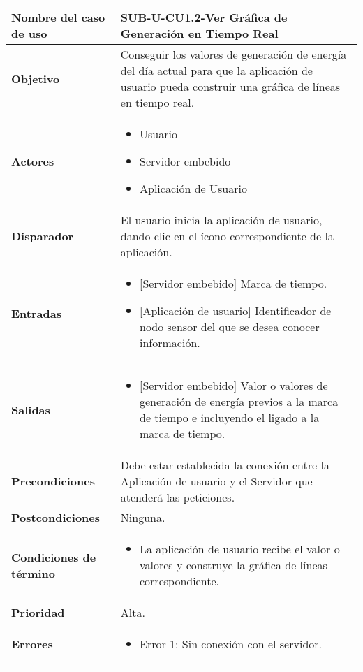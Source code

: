 \begin{longtable}{|J{5cm}|J{10.3cm}|}
	\hline
	\textbf{Nombre del caso de uso} &
		SUB-U-CU1.2-Ver Gráfica de Generación en Tiempo Real \\ \hline
	\textbf{Objetivo} &
		Conseguir los valores de generación de energía del día actual para que la aplicación de usuario pueda construir una gráfica de líneas en tiempo real. \\ \hline
	\textbf{Actores} &
		\begin{itemize}
		    \item Usuario
			\item Servidor embebido
			\item Aplicación de Usuario
		\end{itemize} \\ \hline
	\textbf{Disparador} & 
	    El usuario inicia la aplicación de usuario, dando clic en el ícono correspondiente de la aplicación.\\ \hline 
	\textbf{Entradas} & 
		\begin{itemize}
				\item{[Servidor embebido]} Marca de tiempo.
				\item{[Aplicación de usuario]} Identificador de nodo sensor del que se desea conocer información.
		\end{itemize}\\ \hline 
	\textbf{Salidas} & 
		\begin{itemize}
			\item{[Servidor embebido]} Valor o valores de generación de energía previos a la marca de tiempo e incluyendo el ligado a la marca de tiempo.
		\end{itemize} \\ \hline
	\textbf{Precondiciones} &
		Debe estar establecida la conexión entre la Aplicación de usuario y el Servidor que atenderá las peticiones.
		\\ \hline
	\textbf{Postcondiciones} &
		Ninguna.\\ \hline
	\textbf{Condiciones de término} & 
		\begin{itemize}
			\item La aplicación de usuario recibe el valor o valores y construye la gráfica de líneas correspondiente.
		\end{itemize} \\ \hline 
	\textbf{Prioridad} & 
		Alta. \\ \hline
	\textbf{Errores} & 
		\begin{itemize}
		    \item \label{CUU1.2:Error1} Error 1: Sin conexión con el servidor.

\end{itemize}
\end{longtable}
